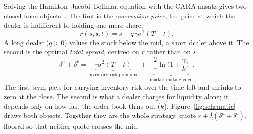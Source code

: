 Solving the Hamilton--Jacobi--Bellman equation with the CARA ansatz gives two closed-form
objects~\cite{avellaneda2008}. The first is the \emph{reservation price}, the price at which the
dealer is indifferent to holding one more share,
\begin{equation}
r(s,q,t) = s - q\,\gamma\sigma^2 (T-t).
\label{eq:reservation}
\end{equation}
A long dealer ($q>0$) values the stock below the mid, a short dealer above it. The second is
the optimal \emph{total spread}, centred on $r$ rather than on $s$,
\begin{equation}
\delta^a+\delta^b = \underbrace{\gamma\sigma^2(T-t)}_{\text{inventory-risk premium}}
 \;+\; \underbrace{\frac{2}{\gamma}\ln\!\Big(1+\frac{\gamma}{k}\Big)}_{\text{market-making edge}} .
\label{eq:spread}
\end{equation}
The first term pays for carrying inventory risk over the time left and shrinks to zero at the
close. The second is what a dealer charges for liquidity alone; it depends only on how fast the
order book thins out ($k$). Figure~\ref{fig:schematic} draws both objects. Together they are the
whole strategy: quote $r\pm\frac12(\delta^a+\delta^b)$, floored so that neither quote crosses the
mid.

